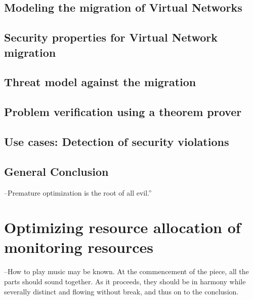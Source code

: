 \documentclass[a4paper, 11pt]{report}
\theoremstyle{definition}
\begin{document}
\newpage
\section{Modeling the migration of Virtual Networks}


\newpage
\section{Security properties for Virtual Network migration}




\section{Threat model against the migration}


\section{Problem verification using a theorem prover}


\section{Use cases: Detection of security violations}


\newpage
\section{General Conclusion}


\newpage
\begin{savequote}
--Premature optimization is the root of all evil.”
\end{savequote}
\chapter{Optimizing resource allocation of monitoring resources}
\label{sec:RAprob}




\newpage


\newpage
\begin{savequote}
--How to play music may be known. At the commencement of the piece, all the parts should sound together. As it proceeds, they should be in harmony while severally distinct and flowing without break, and thus on to the conclusion.
\end{savequote}
\end{document}
